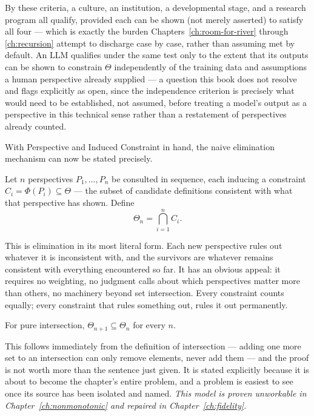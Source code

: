 By these criteria, a culture, an institution, a developmental stage, and a research program all qualify, provided each can be shown (not merely asserted) to satisfy all four --- which is exactly the burden Chapters~\ref{ch:room-for-river} through \ref{ch:recursion} attempt to discharge case by case, rather than assuming met by default. An LLM qualifies under the same test only to the extent that its outputs can be shown to constrain $\Theta$ independently of the training data and assumptions a human perspective already supplied --- a question this book does not resolve and flags explicitly as open, since the independence criterion is precisely what would need to be established, not assumed, before treating a model's output as a perspective in this technical sense rather than a restatement of perspectives already counted.

With Perspective and Induced Constraint in hand, the naive elimination mechanism can now be stated precisely.

\begin{naivemodel}
\begin{definition}
Let $n$ perspectives $P_1, \ldots, P_n$ be consulted in sequence, each inducing a constraint $C_i = \Phi(P_i) \subseteq \Theta$ --- the subset of candidate definitions consistent with what that perspective has shown. Define
\[
\Theta_n = \bigcap_{i=1}^{n} C_i.
\]
\end{definition}

This is elimination in its most literal form. Each new perspective rules out whatever it is inconsistent with, and the survivors are whatever remains consistent with everything encountered so far. It has an obvious appeal: it requires no weighting, no judgment calls about which perspectives matter more than others, no machinery beyond set intersection. Every constraint counts equally; every constraint that rules something out, rules it out permanently.

\begin{proposition}[Monotonicity]
For pure intersection, $\Theta_{n+1} \subseteq \Theta_n$ for every $n$.
\end{proposition}

This follows immediately from the definition of intersection --- adding one more set to an intersection can only remove elements, never add them --- and the proof is not worth more than the sentence just given. It is stated explicitly because it is about to become the chapter's entire problem, and a problem is easiest to see once its source has been isolated and named. \emph{This model is proven unworkable in Chapter~\ref{ch:nonmonotonic} and repaired in Chapter~\ref{ch:fidelity}.}
\end{naivemodel}
